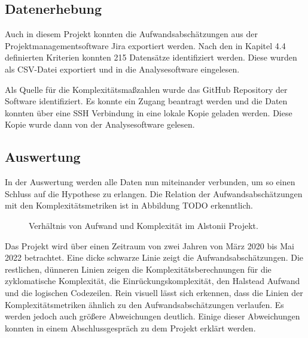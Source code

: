 \subsection{Datenerhebung}\label{Alstonii-Datenerhebung}

Auch in diesem Projekt konnten die Aufwandsabschätzungen aus der
Projektmanagementsoftware Jira exportiert werden. Nach den in Kapitel
4.4 definierten Kriterien konnten 215 Datensätze identifiziert werden.
Diese wurden als CSV-Datei exportiert und in die Analysesoftware
eingelesen.

Als Quelle für die Komplexitätsma\ss zahlen wurde das GitHub Repository der
Software identifiziert. Es konnte ein Zugang beantragt werden und die
Daten konnten über eine \ac{SSH} Verbindung in eine lokale Kopie geladen
werden. Diese Kopie wurde dann von der Analysesoftware gelesen.

\subsection{Auswertung}\label{Alstonii-Auswertung}

In der Auswertung werden alle Daten nun miteinander verbunden, um so
einen Schluss auf die Hypothese zu erlangen. Die Relation der
Aufwandsabschätzungen mit den Komplexitätsmetriken ist in Abbildung TODO
erkenntlich.

\begin{figure}\label{alstonii-graph}
  \begin{center}
      
  \end{center}
  \caption{Verhältnis von Aufwand und Komplexität im Alstonii Projekt.}
\end{figure}


Das Projekt wird über einen Zeitraum von zwei Jahren von März 2020 bis
Mai 2022 betrachtet. Eine dicke schwarze Linie zeigt die
Aufwandsabschätzungen. Die restlichen, dünneren Linien zeigen die
Komplexitätsberechnungen für die zyklomatische Komplexität, die
Einrückungskomplexität, den Halstead Aufwand und die logischen
Codezeilen. Rein visuell lässt sich erkennen, dass die Linien der
Komplexitätsmetriken ähnlich zu den Aufwandsabschätzungen verlaufen. Es
werden jedoch auch grö\ss ere Abweichungen deutlich. Einige dieser
Abweichungen konnten in einem Abschlussgespräch zu dem Projekt erklärt
werden.

